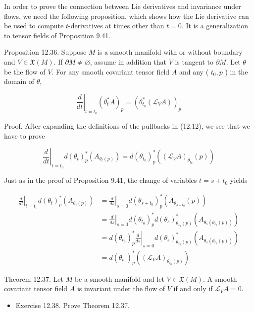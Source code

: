 \documentclass[10pt, letterpaper]{article}
\begin{document}
In order to prove the connection between Lie derivatives and invariance under flows, we need the following proposition, which shows how the Lie derivative can be used to compute $t$-derivatives at times other than $t=0$. It is a generalization to tensor fields of Proposition 9.41.

Proposition 12.36. Suppose $M$ is a smooth manifold with or without boundary and $V \in \mathfrak{X}(M)$. If $\partial M \neq \varnothing$, assume in addition that $V$ is tangent to $\partial M$. Let $\theta$ be the flow of $V$. For any smooth covariant tensor field $A$ and any ( $t_{0}, p$ ) in the domain of $\theta$,

$$
\left.\frac{d}{d t}\right|_{t=t_{0}}\left(\theta_{t}^{*} A\right)_{p}=\left(\theta_{t_{0}}^{*}\left(\mathscr{L}_{V} A\right)\right)_{p}
$$

Proof. After expanding the definitions of the pullbacks in (12.12), we see that we have to prove

$$
\left.\frac{d}{d t}\right|_{t=t_{0}} d\left(\theta_{t}\right)_{p}^{*}\left(A_{\theta_{t}(p)}\right)=d\left(\theta_{t_{0}}\right)_{p}^{*}\left(\left(\mathscr{L}_{V} A\right)_{\theta_{t_{0}}}(p)\right)
$$

Just as in the proof of Proposition 9.41, the change of variables $t=s+t_{0}$ yields

$$
\begin{aligned}
\left.\frac{d}{d t}\right|_{t=t_{0}} d\left(\theta_{t}\right)_{p}^{*}\left(A_{\theta_{t}(p)}\right) & =\left.\frac{d}{d s}\right|_{s=0} d\left(\theta_{s+t_{0}}\right)_{p}^{*}\left(A_{\theta_{s+t_{0}}}(p)\right) \\
& =\left.\frac{d}{d s}\right|_{s=0} d\left(\theta_{t_{0}}\right)_{p}^{*} d\left(\theta_{s}\right)_{\theta_{t_{0}}(p)}^{*}\left(A_{\theta_{s}\left(\theta_{t_{0}}(p)\right)}\right) \\
& =\left.d\left(\theta_{t_{0}}\right)_{p}^{*} \frac{d}{d s}\right|_{s=0} d\left(\theta_{s}\right)_{\theta_{t_{0}}(p)}^{*}\left(A_{\theta_{s}\left(\theta_{t_{0}}(p)\right)}\right) \\
& =d\left(\theta_{t_{0}}\right)_{p}^{*}\left(\left(\mathscr{L}_{V} A\right)_{\theta_{t_{0}}(p)}\right)
\end{aligned}
$$

Theorem 12.37. Let $M$ be a smooth manifold and let $V \in \mathfrak{X}(M)$. A smooth covariant tensor field $A$ is invariant under the flow of $V$ if and only if $\mathscr{L}_{V} A=0$.

\begin{itemize}
  \item Exercise 12.38. Prove Theorem 12.37.
\end{itemize}
\end{document}
